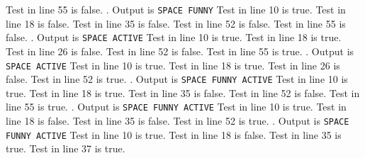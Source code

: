 Test in line 55 is false.
\bigbreak
\noindent\hrulefill{}. Output is {\tt SPACE FUNNY}\quad \hrulefill\null
\smallskip
{}
\medskip
\noindent Test in line 10 is true. Test in line 18 is false. Test in line 35 is false.
Test in line 52 is false.
Test in line 55 is false.
\bigbreak
\noindent\hrulefill{}. Output is {\tt SPACE ACTIVE}\quad \hrulefill\null
\smallskip
{}
\medskip
\noindent Test in line 10 is true. Test in line 18 is true. Test in line 26 is false.
Test in line 52 is false.
Test in line 55 is true.
\bigbreak
\noindent\hrulefill{}. Output is {\tt SPACE ACTIVE}\quad \hrulefill\null
\smallskip
{}
\medskip
\noindent Test in line 10 is true. Test in line 18 is true. Test in line 26 is false.
Test in line 52 is true.
\bigbreak
\noindent\hrulefill{}. Output is {\tt SPACE FUNNY ACTIVE}\quad \hrulefill\null
\smallskip
{}
\medskip
\noindent Test in line 10 is true. Test in line 18 is true. Test in line 35 is false.
Test in line 52 is false.
Test in line 55 is true.
\bigbreak
\noindent\hrulefill{}. Output is {\tt SPACE FUNNY ACTIVE}\quad \hrulefill\null
\smallskip
{}
\medskip
\noindent Test in line 10 is true. Test in line 18 is false. Test in line 35 is false.
Test in line 52 is true.
\bigbreak
\noindent\hrulefill{}. Output is {\tt SPACE FUNNY ACTIVE}\quad \hrulefill\null
\smallskip
{}
\medskip
\noindent Test in line 10 is true. Test in line 18 is false. Test in line 35 is true.
Test in line 37 is true.
\bye
